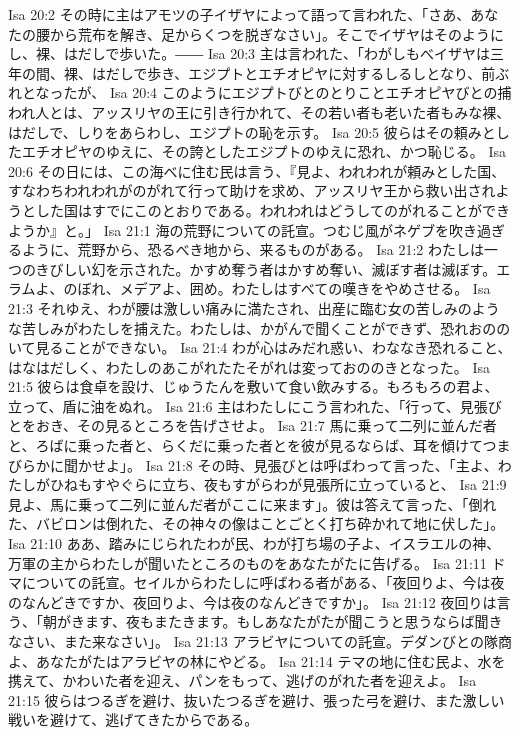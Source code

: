 Isa 20:2  その時に主はアモツの子イザヤによって語って言われた、「さあ、あなたの腰から荒布を解き、足からくつを脱ぎなさい」。そこでイザヤはそのようにし、裸、はだしで歩いた。――
Isa 20:3  主は言われた、「わがしもべイザヤは三年の間、裸、はだしで歩き、エジプトとエチオピヤに対するしるしとなり、前ぶれとなったが、
Isa 20:4  このようにエジプトびとのとりことエチオピヤびとの捕われ人とは、アッスリヤの王に引き行かれて、その若い者も老いた者もみな裸、はだしで、しりをあらわし、エジプトの恥を示す。
Isa 20:5  彼らはその頼みとしたエチオピヤのゆえに、その誇としたエジプトのゆえに恐れ、かつ恥じる。
Isa 20:6  その日には、この海べに住む民は言う、『見よ、われわれが頼みとした国、すなわちわれわれがのがれて行って助けを求め、アッスリヤ王から救い出されようとした国はすでにこのとおりである。われわれはどうしてのがれることができようか』と。」
Isa 21:1  海の荒野についての託宣。つむじ風がネゲブを吹き過ぎるように、荒野から、恐るべき地から、来るものがある。
Isa 21:2  わたしは一つのきびしい幻を示された。かすめ奪う者はかすめ奪い、滅ぼす者は滅ぼす。エラムよ、のぼれ、メデアよ、囲め。わたしはすべての嘆きをやめさせる。
Isa 21:3  それゆえ、わが腰は激しい痛みに満たされ、出産に臨む女の苦しみのような苦しみがわたしを捕えた。わたしは、かがんで聞くことができず、恐れおののいて見ることができない。
Isa 21:4  わが心はみだれ惑い、わななき恐れること、はなはだしく、わたしのあこがれたたそがれは変っておののきとなった。
Isa 21:5  彼らは食卓を設け、じゅうたんを敷いて食い飲みする。もろもろの君よ、立って、盾に油をぬれ。
Isa 21:6  主はわたしにこう言われた、「行って、見張びとをおき、その見るところを告げさせよ。
Isa 21:7  馬に乗って二列に並んだ者と、ろばに乗った者と、らくだに乗った者とを彼が見るならば、耳を傾けてつまびらかに聞かせよ」。
Isa 21:8  その時、見張びとは呼ばわって言った、「主よ、わたしがひねもすやぐらに立ち、夜もすがらわが見張所に立っていると、
Isa 21:9  見よ、馬に乗って二列に並んだ者がここに来ます」。彼は答えて言った、「倒れた、バビロンは倒れた、その神々の像はことごとく打ち砕かれて地に伏した」。
Isa 21:10  ああ、踏みにじられたわが民、わが打ち場の子よ、イスラエルの神、万軍の主からわたしが聞いたところのものをあなたがたに告げる。
Isa 21:11  ドマについての託宣。セイルからわたしに呼ばわる者がある、「夜回りよ、今は夜のなんどきですか、夜回りよ、今は夜のなんどきですか」。
Isa 21:12  夜回りは言う、「朝がきます、夜もまたきます。もしあなたがたが聞こうと思うならば聞きなさい、また来なさい」。
Isa 21:13  アラビヤについての託宣。デダンびとの隊商よ、あなたがたはアラビヤの林にやどる。
Isa 21:14  テマの地に住む民よ、水を携えて、かわいた者を迎え、パンをもって、逃げのがれた者を迎えよ。
Isa 21:15  彼らはつるぎを避け、抜いたつるぎを避け、張った弓を避け、また激しい戦いを避けて、逃げてきたからである。
